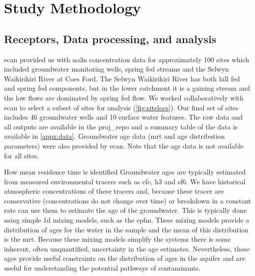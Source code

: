 \section[Methods]{Study Methodology}   \label{sec:methods}
\subsection[Data Processing]{Receptors, Data processing, and analysis} \label{sec:data}

\gls{ecan} provided us with \gls{no3n} concentration data for approximately 100 sites which included groundwater monitoring wells, spring fed streams and the Selwyn Waikirikiri River at Coes Ford.
The Selwyn Waikirikiri River has both hill fed and spring fed components, but in the lower catchment it is a gaining stream and the low flows are dominated by spring fed flow.
We worked collaboratively with \gls{ecan} to select a subset of sites for analysis (\autoref{fig:sitelocs}).
Our final set of sites includes 46 groundwater wells and 10 surface water features.
The raw data and all outputs are available in the \gls{proj_repo} and a summary table of the data is available in \autoref{appx:data}.
Groundwater age data (\gls{mrt} and age distribution parameters) were also provided by \gls{ecan}.
Note that the age data is not available for all sites.

\begin{breakawaybox}[label={box:mrt}]{How mean residence time is identified}
    Groundwater ages are typically estimated from measured environmental tracers such as \gls{cfc}, \gls{h3} and \gls{sf6}.
    We have historical atmospheric concentrations of these tracers and, because these tracer are conservative (concentrations do not change over time) or breakdown in a constant rate can use them to estimate the age of the groundwater.  This is typically done using simple 1d mixing models, such as the \gls{epfm}. These mixing models provide a distribution of ages for the water in the sample and the mean of this distribution is the \gls{mrt}. Because these mixing models simplify the systems there is some inherent, often unquantified, uncertainty in the age estimates. Nevertheless, these ages provide useful constraints on the distribution of ages in the aquifer and are useful for understanding the potential pathways of contaminants.

\end{breakawaybox}

